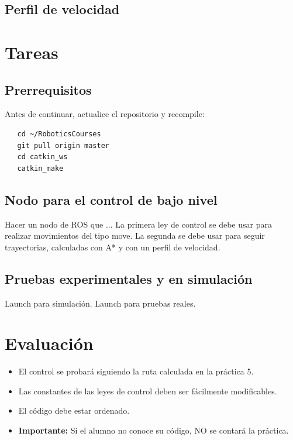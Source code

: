 \documentclass[letterpaper,12pt]{article}
\begin{document}
\subsection{Perfil de velocidad}

\section{Tareas}

\subsection{Prerrequisitos}
Antes de continuar, actualice el repositorio y recompile:
\begin{verbatim}
   cd ~/RoboticsCourses
   git pull origin master
   cd catkin_ws
   catkin_make
\end{verbatim}

\subsection{Nodo para el control de bajo nivel}
Hacer un nodo de ROS que ...
La primera ley de control se debe usar para realizar movimientos del tipo move.
La segunda se debe usar para seguir trayectorias, calculadas con A* y con un perfil de velocidad. 

\subsection{Pruebas experimentales y en simulación}
Launch para simulación. Launch para pruebas reales.

\section{Evaluación}
\begin{itemize}
\item El control se probará siguiendo la ruta calculada en la práctica 5. 
\item Las constantes de las leyes de control deben ser fácilmente modificables. 
\item El código debe estar ordenado.
\item \textbf{Importante: } Si el alumno no conoce su código, NO se contará la práctica.
\end{itemize}
\end{document}
